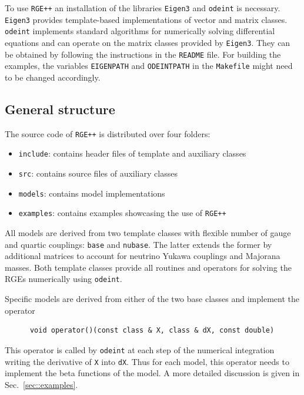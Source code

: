 \documentclass[11pt,a4paper]{article}
\begin{document}
To use \texttt{RGE++} an installation of the libraries \texttt{Eigen3} \cite{eigenweb} and \texttt{odeint} \cite{Ahnert:2011} is necessary.
\texttt{Eigen3} provides template-based implementations of vector and matrix classes. \texttt{odeint} implements standard algorithms for numerically solving differential equations
and can operate on the matrix classes provided by \texttt{Eigen3}.
They can be obtained by following the instructions in the \texttt{README} file. For building the examples, the variables \texttt{EIGENPATH} and \texttt{ODEINTPATH} in the \texttt{Makefile} might need to be changed accordingly.

\subsection{\label{sec::operation} General structure}
The source code of \texttt{RGE++} is distributed over four folders:
\begin{itemize}
\item \texttt{include}: contains header files of template and auxiliary classes
\item \texttt{src}: contains source files of auxiliary classes
\item \texttt{models}: contains model implementations
\item \texttt{examples}: contains examples showcasing the use of \texttt{RGE++}
\end{itemize}

All models are derived from two template classes with flexible number of gauge and quartic couplings: \texttt{base} and \texttt{nubase}. The latter extends the former by additional matrices to account for neutrino Yukawa couplings
and Majorana masses. Both template classes provide all routines and operators for solving the RGEs numerically using \texttt{odeint}.

Specific models are derived from either of the two base classes and implement the operator
\begin{lstlisting}
      void operator()(const class & X, class & dX, const double)
\end{lstlisting}
This operator is called by \texttt{odeint} at each step of the numerical integration writing the derivative of \texttt{X} into \texttt{dX}.
Thus for each model, this operator needs to implement the beta functions of the model. A more detailed discussion is given in Sec.~\ref{sec::examples}.
\end{document}
